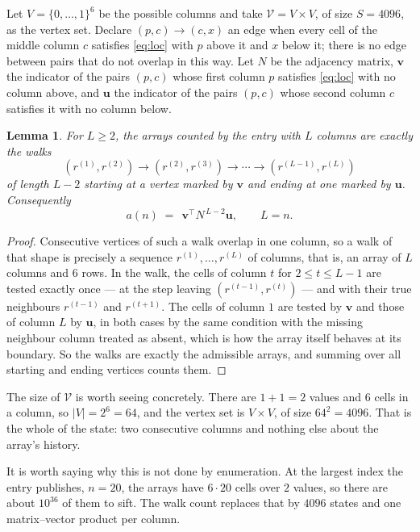\documentclass[11pt,a4paper]{article}
\theoremstyle{plain}
\newtheorem{lemma}[theorem]{Lemma}
\theoremstyle{definition}
\begin{document}
Let $V=\{0,\dots,1\}^{6}$ be the possible columns and take
$\mathcal V=V\times V$, of size $S=4096$, as the vertex set. Declare $(p,c)\to(c,x)$ an edge
when every cell of the middle column $c$ satisfies \eqref{eq:loc} with $p$ above it and $x$
below it; there is no edge between pairs that do not overlap in this way. Let $N$ be the
adjacency matrix, $\mathbf{v}$ the indicator of the pairs $(p,c)$ whose first column $p$
satisfies \eqref{eq:loc} with no column above, and $\mathbf{u}$ the indicator of
the pairs $(p,c)$ whose second column $c$ satisfies it with no column below.

\begin{lemma}\label{lem:walk}
For $L\ge2$, the arrays counted by the entry with $L$ columns are exactly the walks
\[
(r^{(1)},r^{(2)})\to(r^{(2)},r^{(3)})\to\cdots\to(r^{(L-1)},r^{(L)})
\]
of length $L-2$ starting at a vertex marked by $\mathbf{v}$ and ending at one marked by
$\mathbf{u}$. Consequently
\[
a(n)\;=\;\,\mathbf{v}^{\!\top}N^{\,L-2}\mathbf{u},\qquad L=n .
\]
\end{lemma}

\begin{proof}
Consecutive vertices of such a walk overlap in one column, so a walk of that shape is
precisely a sequence $r^{(1)},\dots,r^{(L)}$ of columns, that is, an array of $L$ columns
and $6$ rows. In the walk, the cells of column $t$ for $2\le t\le L-1$ are tested
exactly once --- at the step leaving $(r^{(t-1)},r^{(t)})$ --- and with their true
neighbours $r^{(t-1)}$ and $r^{(t+1)}$. The cells of column $1$ are tested by
$\mathbf{v}$ and those of column $L$ by $\mathbf{u}$, in both cases by the same condition
with the missing neighbour column treated as absent, which is how the array itself behaves at
its boundary. So the walks are exactly the admissible arrays, and summing over all starting
and ending vertices counts them.
\end{proof}


The size of $\mathcal V$ is worth seeing concretely. There are $1+1=2$ values
and $6$ cells in a column, so $|V|=2^{6}=64$, and the vertex set is
$V\times V$, of size $64^2=4096$. That is the whole of the state: two consecutive
columns and nothing else about the array's history.

It is worth saying why this is not done by enumeration. At the largest index the entry
publishes, $n=20$, the arrays have $6\cdot20$ cells over
$2$ values, so there are about $10^{36}$ of them to sift. The
walk count replaces that by $4096$ states and one matrix--vector product per column.
\end{document}
